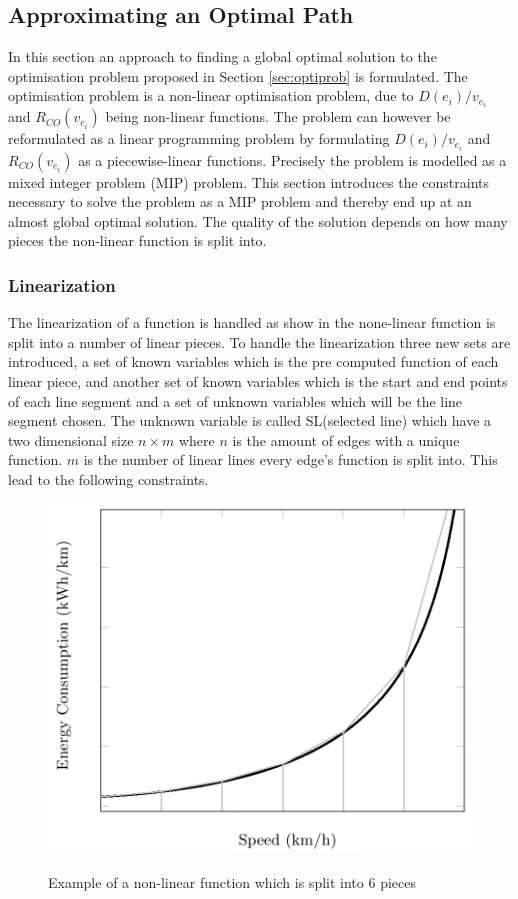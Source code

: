 
\subsection{Approximating an Optimal Path}\label{sec:LP}
In this section an approach to finding a global optimal solution to the optimisation problem proposed in Section \ref{sec:optiprob} is formulated. The optimisation problem is a non-linear optimisation problem, due to \( D(e_i)/v_{e_i} \) and $R_{CO}(v_{e_i})$ being non-linear functions. The problem can however be reformulated as a linear programming problem by formulating \( D(e_i)/v_{e_i} \) and $R_{CO}(v_{e_i})$ as a piecewise-linear functions. Precisely the problem is modelled as a mixed integer problem (MIP) problem. This section introduces the constraints necessary to solve the problem as a MIP problem and thereby end up at an almost global optimal solution. The quality of the solution depends on how many pieces the non-linear function is split into. 

\subsubsection{Linearization}
The linearization of a function is handled as show in  the none-linear function is split into a number of linear pieces. To handle the linearization three new sets are introduced, a set of known variables which is the pre computed function of each linear piece, and another set of known variables which is the start and end points of each line segment and a set of unknown variables which will be the line segment chosen. The unknown variable is called SL(selected line) which have a two dimensional size $n \times m$ where $n$ is the amount of edges with a unique function. $m$ is the number of linear lines every edge's function is split into. This lead to the following constraints.  

\begin{figure}[h!]
\centering
\includegraphics[scale=0.33]{images/linearization_example}
\label{fig:linearization_example}
\caption{Example of a non-linear function which is split into 6 pieces}
\end{figure}

